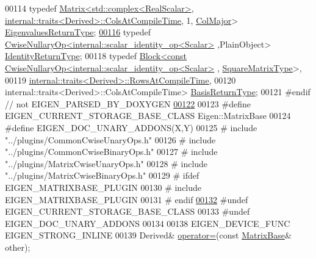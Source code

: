 \begin{DoxyCode}
00114     \textcolor{keyword}{typedef} \hyperlink{group___core___module_class_eigen_1_1_matrix}{Matrix<std::complex<RealScalar>}, 
      \hyperlink{struct_eigen_1_1internal_1_1traits}{internal::traits<Derived>::ColsAtCompileTime}, 1, 
      \hyperlink{group__enums_ggaacded1a18ae58b0f554751f6cdf9eb13a0cbd4bdd0abcfc0224c5fcb5e4f6669a}{ColMajor}> \hyperlink{group___core___module_class_eigen_1_1_matrix}{EigenvaluesReturnType};
\hyperlink{group___core___module_aaf3ed6d9cad060b3e5685b3839271706}{00116}     \textcolor{keyword}{typedef} \hyperlink{group___core___module_class_eigen_1_1_cwise_nullary_op}{CwiseNullaryOp<internal::scalar\_identity\_op<Scalar>}
      ,PlainObject> \hyperlink{group___core___module_class_eigen_1_1_cwise_nullary_op}{IdentityReturnType};
00118     \textcolor{keyword}{typedef} \hyperlink{group___core___module_class_eigen_1_1_block}{Block<const CwiseNullaryOp<internal::scalar\_identity\_op<Scalar>}
      , \hyperlink{group___core___module_class_eigen_1_1_matrix}{SquareMatrixType}>,
00119                   \hyperlink{struct_eigen_1_1internal_1_1traits}{internal::traits<Derived>::RowsAtCompileTime},
00120                   internal::traits<Derived>::ColsAtCompileTime> \hyperlink{group___core___module_class_eigen_1_1_block}{BasisReturnType};
00121 \textcolor{preprocessor}{#endif // not EIGEN\_PARSED\_BY\_DOXYGEN}
\hyperlink{group___core___module_a03db69599e5dc10f9b7524bbdd0bdcbb}{00122} 
00123 \textcolor{preprocessor}{#define EIGEN\_CURRENT\_STORAGE\_BASE\_CLASS Eigen::MatrixBase}
00124 \textcolor{preprocessor}{#define EIGEN\_DOC\_UNARY\_ADDONS(X,Y)}
00125 \textcolor{preprocessor}{#   include "../plugins/CommonCwiseUnaryOps.h"}
00126 \textcolor{preprocessor}{#   include "../plugins/CommonCwiseBinaryOps.h"}
00127 \textcolor{preprocessor}{#   include "../plugins/MatrixCwiseUnaryOps.h"}
00128 \textcolor{preprocessor}{#   include "../plugins/MatrixCwiseBinaryOps.h"}
00129 \textcolor{preprocessor}{#   ifdef EIGEN\_MATRIXBASE\_PLUGIN}
00130 \textcolor{preprocessor}{#     include EIGEN\_MATRIXBASE\_PLUGIN}
00131 \textcolor{preprocessor}{#   endif}
\hyperlink{group___core___module_ad2a4070503e44b1f9e7fc99b4cb5697b}{00132} \textcolor{preprocessor}{#undef EIGEN\_CURRENT\_STORAGE\_BASE\_CLASS}
00133 \textcolor{preprocessor}{#undef EIGEN\_DOC\_UNARY\_ADDONS}
00134 
00138     EIGEN\_DEVICE\_FUNC EIGEN\_STRONG\_INLINE
00139     Derived& \hyperlink{group___core___module_a706a4dd1ee54786e9210de1a4bf02600}{operator=}(\textcolor{keyword}{const} \hyperlink{group___core___module_class_eigen_1_1_matrix_base}{MatrixBase}& other);

\end{DoxyCode}
